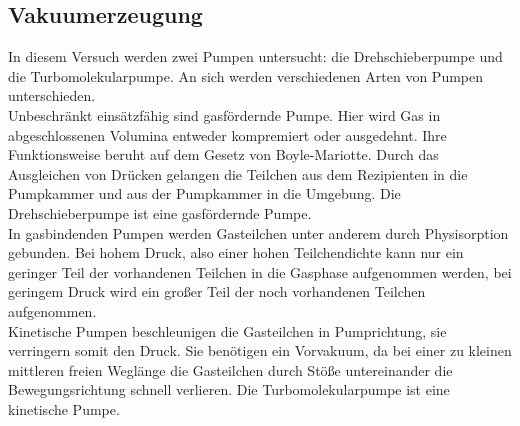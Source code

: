     \subsection{Vakuumerzeugung}
        In diesem Versuch werden zwei Pumpen untersucht: die Drehschieberpumpe und die Turbomolekularpumpe. An sich werden verschiedenen Arten von Pumpen unterschieden. \\
        Unbeschränkt einsätzfähig sind gasfördernde Pumpe. Hier wird Gas in abgeschlossenen Volumina entweder kompremiert oder ausgedehnt. Ihre Funktionsweise beruht auf dem Gesetz von 
        Boyle-Mariotte. Durch das Ausgleichen von Drücken gelangen die Teilchen aus dem Rezipienten in die Pumpkammer und aus der Pumpkammer in die Umgebung. Die Drehschieberpumpe ist eine 
        gasfördernde Pumpe. \\
        In gasbindenden Pumpen werden Gasteilchen unter anderem durch Physisorption gebunden. Bei hohem Druck, also einer hohen Teilchendichte kann nur ein geringer Teil der vorhandenen 
        Teilchen in die Gasphase aufgenommen werden, bei geringem Druck wird ein großer Teil der noch vorhandenen Teilchen aufgenommen. \\
        Kinetische Pumpen beschleunigen die Gasteilchen in Pumprichtung, sie verringern somit den Druck. 
        Sie benötigen ein Vorvakuum, da bei einer zu kleinen mittleren freien Weglänge die Gasteilchen durch Stöße untereinander die Bewegungsrichtung schnell verlieren. 
        Die Turbomolekularpumpe ist eine kinetische Pumpe.


